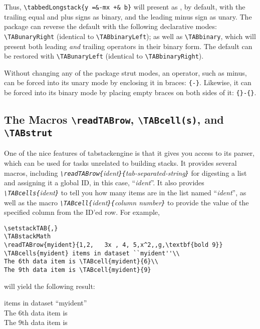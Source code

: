 \documentclass{article}
\begin{document}
Thus, \verb|\tabbedLongstack{y =&-mx +& b}| will present as 
{}, by default,
with the trailing equal and plus signs as binary, and the leading minus sign as unary.  The package
can reverse the default with the following declarative modes: 
\verb|\TABunaryRight| (identical to \verb|\TABbinaryLeft|); as well
as \verb|\TABbinary|, which will present both leading \textit{and} trailing operators in
their binary form.  The default can be restored with 
\verb|\TABunaryLeft| (identical to \verb|\TABbinaryRight|).

Without changing any of the package strut modes, an operator, such as minus, can be 
forced into its unary mode
by enclosing it in braces: \verb|{-}|.  Likewise, it can be forced into its binary mode by
placing empty braces on both sides of it: \verb|{}-{}|.

\subsection*{The Macros \texttt{\textbackslash readTABrow}, \texttt{\textbackslash TABcell(s)}, 
and \texttt{\textbackslash TABstrut}}

One of the nice features of \textsf{tabstackengine} is that it gives you access to its parser,
which can be used for tasks unrelated to building stacks.  
It provides several macros, including 
{\itshape\verb|\readTABrow{|ident\verb|}{|tab-separated-string\verb|}|} for 
digesting a list and assigning it a global ID, in this case, ``{\itshape ident}''. It also provides 
{\itshape\verb|\TABcells{|ident\verb|}|} to tell you how many items are in the list named 
``{\itshape ident}'', as well as the macro {\itshape\verb|\TABcell{|ident\verb|}{|column number\verb|}|} to 
provide the value of the specified column from the ID'ed row.   For example,

\begin{verbatim}
\setstackTAB{,}
\TABstackMath
\readTABrow{myident}{1,2,   3x , 4, 5,x^2,,g,\textbf{bold 9}}
\TABcells{myident} items in dataset ``myident''\\
The 6th data item is \TABcell{myident}{6}\\
The 9th data item is \TABcell{myident}{9}
\end{verbatim}

will yield the following result:

\TABstackMath
{\setstackTAB{,}
 items in dataset ``myident''\\
The 6th data item is \\
The 9th data item is }
\end{document}
